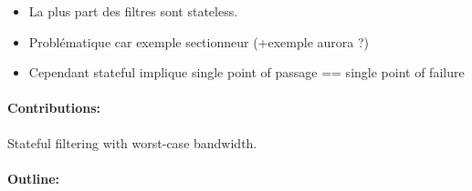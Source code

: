 \begin{itemize}
    \item La plus part des filtres sont stateless.
    \item Problématique car exemple sectionneur (+exemple aurora ?)
    \item Cependant stateful implique single point of passage == single point of failure
\end{itemize}

\paragraph{Contributions:} Stateful filtering with worst-case bandwidth.

\paragraph{Outline:} 
